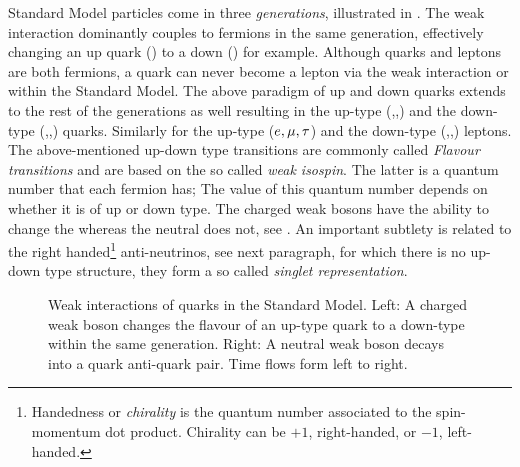Standard Model particles come in three {\it generations}, illustrated in .
The weak interaction dominantly couples to fermions in the same generation, effectively changing an up quark (\uquark) to a down (\dquark) for example.
Although quarks and leptons are both fermions, a quark can never become a lepton via the weak interaction or \viceversa within the Standard Model.
The above paradigm of up and down quarks extends to the rest of the generations as well resulting in the up-type (\uquark,\cquark,\tquark)
and the down-type (\dquark,\squark,\bquark) quarks. Similarly for the  up-type ($e,\mu,\tau$) and the down-type (\neue,\neum,\neut)
leptons. The above-mentioned up-down type transitions are commonly called {\it Flavour transitions} and are based on the so called
{\it weak isospin}. The latter is a quantum number that each fermion has; The value of this quantum number depends on whether it is of up or down type.
The charged weak bosons \Wpm have the ability to change the whereas the neutral \Z  does not, see .
An important subtlety is related to the right handed\footnote{Handedness or {\it chirality} is the quantum number associated to the
spin-momentum dot product. Chirality can be $+1$, right-handed, or $-1$, left-handed. } anti-neutrinos, see next paragraph,
for which there is no up-down type structure, \ie they form a so called {\it singlet representation}.

\begin{figure}[t]
  \centering
  \begin{subfigure}{0.49\textwidth}
    \hspace{1.3cm}
    \scalebox{1.}{}
    \caption{}
    \label{CC_WeakInteractions}
  \end{subfigure}%
  \hfill%
  \begin{subfigure}{0.49\textwidth}
    \hspace{1.3cm}
    \scalebox{1.}{}
    \caption{}
    \label{NC_WeakInteractions}
  \end{subfigure}
  \caption{Weak interactions of quarks in the Standard Model. Left: A charged weak boson changes the flavour
           of an up-type quark to a down-type within the same generation.
           Right: A neutral weak boson decays into a quark anti-quark pair. Time flows form left to right.}
\label{WeakInteractions}
\end{figure}

